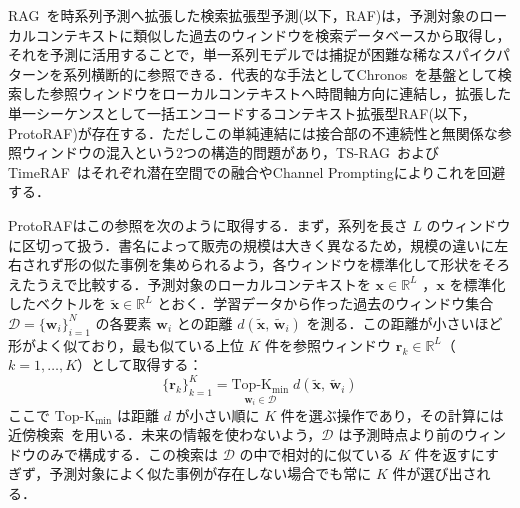 \documentclass[twocolumn, lastpage]{jarticle}
\begin{document}
RAG~\cite{Lewis.2020}を時系列予測へ拡張した検索拡張型予測(以下，RAF)は，予測対象のローカルコンテキストに類似した過去のウィンドウを検索データベースから取得し，それを予測に活用することで，単一系列モデルでは捕捉が困難な稀なスパイクパターンを系列横断的に参照できる．代表的な手法としてChronos~\cite{Ansari.2024}を基盤として検索した参照ウィンドウをローカルコンテキストへ時間軸方向に連結し，拡張した単一シーケンスとして一括エンコードするコンテキスト拡張型RAF(以下，ProtoRAF)が存在する\cite{Tire.2024}．ただしこの単純連結には接合部の不連続性と無関係な参照ウィンドウの混入という2つの構造的問題があり，TS-RAG~\cite{Ning.2025}およびTimeRAF~\cite{Zhang.2024}はそれぞれ潜在空間での融合やChannel Promptingによりこれを回避する．

ProtoRAFはこの参照を次のように取得する．まず，系列を長さ $L$ のウィンドウに区切って扱う．書名によって販売の規模は大きく異なるため，規模の違いに左右されず形の似た事例を集められるよう，各ウィンドウを標準化して形状をそろえたうえで比較する．予測対象のローカルコンテキストを $\bm{x} \in \mathbb{R}^{L}$ ，$\bm{x}$ を標準化したベクトルを $\tilde{\bm{x}} \in \mathbb{R}^{L} $ とおく．学習データから作った過去のウィンドウ集合 $\mathcal{D} = \{\bm{w}_i\}_{i=1}^{N}$ の各要素 $\bm{w}_i$ との距離 $d(\tilde{\bm{x}},\, \tilde{\bm{w}}_i)$ を測る．この距離が小さいほど形がよく似ており，最も似ている上位 $K$ 件を参照ウィンドウ $\bm{r}_k \in \mathbb{R}^{L}$（$k = 1, \dots, K$）として取得する：
    \begin{equation}
        \{\bm{r}_k\}_{k=1}^{K} = \underset{\bm{w}_i \in \mathcal{D}}{\operatorname{Top\text{-}K_{\mathrm{min}}}}\; d(\tilde{\bm{x}},\, \tilde{\bm{w}}_i)
    \end{equation}
ここで $\operatorname{Top\text{-}K_{\mathrm{min}}}$ は距離 $d$ が小さい順に $K$ 件を選ぶ操作であり，その計算には近傍検索~\cite{Johnson.2019}を用いる．未来の情報を使わないよう，$\mathcal{D}$ は予測時点より前のウィンドウのみで構成する．この検索は $\mathcal{D}$ の中で相対的に似ている $K$ 件を返すにすぎず，予測対象によく似た事例が存在しない場合でも常に $K$ 件が選び出される．
\end{document}
